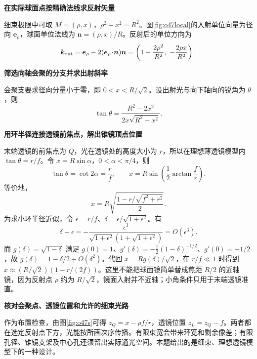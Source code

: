 \begin{solution}
\par\medskip{}\noindent\textbf{在实际球面点按精确法线求反射矢量}\par\nobreak
细束极限中可取 \(M=(\rho,x)\)，\(\rho^2+x^2=R^2\)。图\ref{fig:o47local}的入射单位向量为径向 \(\boldsymbol e_\rho\)，球面单位法线为 \(\boldsymbol n=(\rho,x)/R\)。反射后的单位方向为
\[
 \boldsymbol k_{\rm out}
 =\boldsymbol e_\rho-2(\boldsymbol e_\rho\!\cdot\!\boldsymbol n)\boldsymbol n
 =\left(1-\frac{2\rho^2}{R^2},\ -\frac{2\rho x}{R^2}\right).
\]


\par\medskip{}\noindent\textbf{筛选向轴会聚的分支并求出射斜率}\par\nobreak
会聚支要求径向分量小于零，即 \(0<x<R/\sqrt2\)。设出射光与向下轴向的锐角为 \(\theta\)，则
\[
 \tan\theta=\frac{R^2-2x^2}{2x\sqrt{R^2-x^2}}.
\]


\par\medskip{}\noindent\textbf{用环半径连接透镜前焦点，解出锥镜顶点位置}\par\nobreak
末端透镜的前焦点为 \(Q\)，光在透镜处的高度大小为 \(r\)，所以在理想薄透镜模型内 \(\tan\theta=r/f\)。令 \(x=R\sin\alpha\)，\(0<\alpha<\pi/4\)，则
\[
 \tan\theta=\cot 2\alpha=\frac rf,
 \qquad \boxed{x=R\sin\!\left(\frac12\arctan\frac fr\right)}.
\]
等价地，
\[
 \boxed{x=R\sqrt{\frac{1-r/\sqrt{f^2+r^2}}{2}}}.
\]
为求小环半径近似，令 $\epsilon=r/f$、$\delta=\epsilon/\sqrt{1+\epsilon^2}$。有
\[
 \delta-\epsilon
 =-\frac{\epsilon^3}{\sqrt{1+\epsilon^2}(1+\sqrt{1+\epsilon^2})}
 =O(\epsilon^3).
\]
而 $g(\delta)=\sqrt{1-\delta}$ 满足 $g(0)=1$、$g'(\delta)=-\tfrac12(1-\delta)^{-1/2}$、$g'(0)=-1/2$，故 $g(\delta)=1-\delta/2+O(\delta^2)$。代回 $x=Rg(\delta)/\sqrt2$，在 \(r/f\ll1\) 时得到 \(x\approx(R/\sqrt2)(1-r/(2f))\)。这里不能把球面镜简单替成焦距 \(R/2\) 的近轴镜，因为反射点 \(\rho\) 约为 \(R/\sqrt2\)，镜面入射并不近轴；小角条件只用于末端透镜准直。



\par\medskip{}\noindent\textbf{核对会聚点、透镜位置和允许的细束光路}\par\nobreak
作为布置检查，由图\ref{fig:o47s}可得 \(z_Q=x-\rho f/r\)，透镜位置 \(z_L=z_Q-f\)。两者都在选定反射点下方，光能按所画次序传播。有限束宽会带来环宽和剩余像差；有限孔径、锥镜支架及中心孔还须留出实际通光空间。本题给出的是细束、理想透镜模型下的一种设计。
\end{solution}

